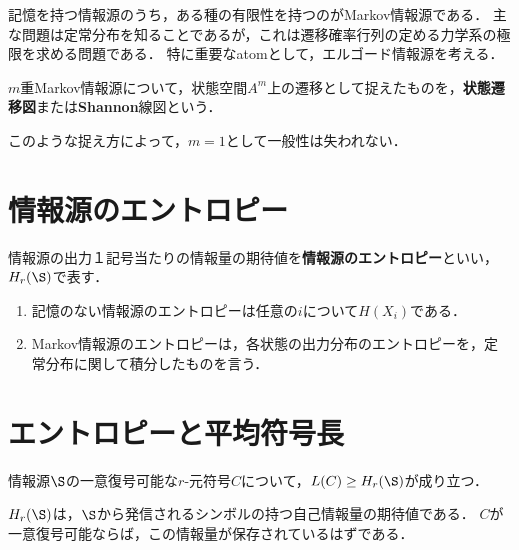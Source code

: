 \documentclass[uplatex,dvipdfmx]{jsreport}
\begin{document}
\begin{tcolorbox}[colframe=ForestGreen, colback=ForestGreen!10!white,breakable,colbacktitle=ForestGreen!40!white,coltitle=black,fonttitle=\bfseries\sffamily,
title=]
    記憶を持つ情報源のうち，ある種の有限性を持つのがMarkov情報源である．
    主な問題は定常分布を知ることであるが，これは遷移確率行列の定める力学系の極限を求める問題である．
    特に重要なatomとして，エルゴード情報源を考える．
\end{tcolorbox}

\begin{definition}
    $m$重Markov情報源について，状態空間$A^m$上の遷移として捉えたものを，\textbf{状態遷移図}または\textbf{Shannon}線図という．
\end{definition}
\begin{remarks}
    このような捉え方によって，$m=1$として一般性は失われない．
\end{remarks}

\section{情報源のエントロピー}

\begin{definition}
    情報源の出力１記号当たりの情報量の期待値を\textbf{情報源のエントロピー}といい，$H_r(\S)$で表す．
\end{definition}
\begin{example}\mbox{}
    \begin{enumerate}
        \item 記憶のない情報源のエントロピーは任意の$i$について$H(X_i)$である．
        \item Markov情報源のエントロピーは，各状態の出力分布のエントロピーを，定常分布に関して積分したものを言う．
    \end{enumerate}
\end{example}

\section{エントロピーと平均符号長}

\begin{theorem}
    情報源$\S$の一意復号可能な$r$-元符号$C$について，$L(C)\ge H_r(\S)$が成り立つ．
\end{theorem}
\begin{remarks}
    $H_r(\S)$は，$\S$から発信されるシンボルの持つ自己情報量の期待値である．
    $C$が一意復号可能ならば，この情報量が保存されているはずである．
\end{remarks}
\end{document}
